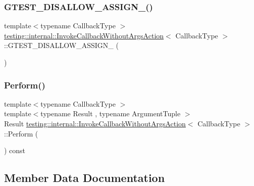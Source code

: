 \subsubsection{\texorpdfstring{GTEST\_DISALLOW\_ASSIGN\_()}{GTEST\_DISALLOW\_ASSIGN\_()}}
{\footnotesize\ttfamily template$<$typename Callback\+Type $>$ \\
\mbox{\hyperlink{classtesting_1_1internal_1_1_invoke_callback_without_args_action}{testing\+::internal\+::\+Invoke\+Callback\+Without\+Args\+Action}}$<$ Callback\+Type $>$\+::G\+T\+E\+S\+T\+\_\+\+D\+I\+S\+A\+L\+L\+O\+W\+\_\+\+A\+S\+S\+I\+G\+N\+\_\+ (\begin{DoxyParamCaption}\item[{\mbox{\hyperlink{classtesting_1_1internal_1_1_invoke_callback_without_args_action}{Invoke\+Callback\+Without\+Args\+Action}}$<$ Callback\+Type $>$}]{ }\end{DoxyParamCaption})\hspace{0.3cm}{\ttfamily [private]}}

\mbox{\label{classtesting_1_1internal_1_1_invoke_callback_without_args_action_ac43b186c6daa5f21c8377678c6a9d4ba}} 
\subsubsection{\texorpdfstring{Perform()}{Perform()}}
{\footnotesize\ttfamily template$<$typename Callback\+Type $>$ \\
template$<$typename Result , typename Argument\+Tuple $>$ \\
Result \mbox{\hyperlink{classtesting_1_1internal_1_1_invoke_callback_without_args_action}{testing\+::internal\+::\+Invoke\+Callback\+Without\+Args\+Action}}$<$ Callback\+Type $>$\+::Perform (\begin{DoxyParamCaption}\item[{const Argument\+Tuple \&}]{ }\end{DoxyParamCaption}) const\hspace{0.3cm}{\ttfamily [inline]}}



\subsection{Member Data Documentation}
\mbox{\label{classtesting_1_1internal_1_1_invoke_callback_without_args_action_a4da1a28e964fd7eeabadab7ca82c79c2}} 
